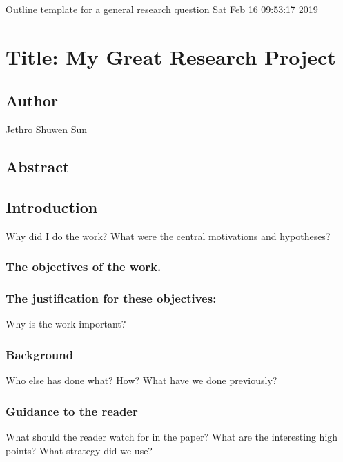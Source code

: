 \documentclass[11pt]{article}
\author{Jethro Shuwen Sun}
\date{\today}
\title{}
\begin{document}
\tableofcontents

Outline template for a general research question
Sat Feb 16 09:53:17 2019

\section{Title: My Great Research Project}
\label{sec:orgd228933}


\subsection{Author}
\label{sec:org5f270d2}
Jethro Shuwen Sun

\subsection{Abstract}
\label{sec:org3dc16d7}
\vspace*{120px}

\subsection{Introduction}
\label{sec:org3153e59}
Why did I do the work? What were the central motivations and hypotheses?
\vspace*{120px}

\subsubsection{The objectives of the work.}
\label{sec:org436b9b6}
\vspace*{120px}

\subsubsection{The justification for these objectives:}
\label{sec:orga504b57}
Why is the work important?
\vspace*{120px}

\subsubsection{Background}
\label{sec:org9af8c5a}
Who else has done what? How? What have we done previously?
\vspace*{120px}

\subsubsection{Guidance to the reader}
\label{sec:org7916da9}
What should the reader watch for in the paper? What are the interesting high
points? What strategy did we use?
\vspace*{120px}
\end{document}

